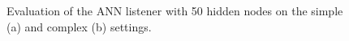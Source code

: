 \begin{figure}[t]
  \centering
  \hspace{40pt}
  \caption{Evaluation of the ANN listener with 50 hidden nodes on the simple (a) and complex (b) settings.}


\end{figure}
